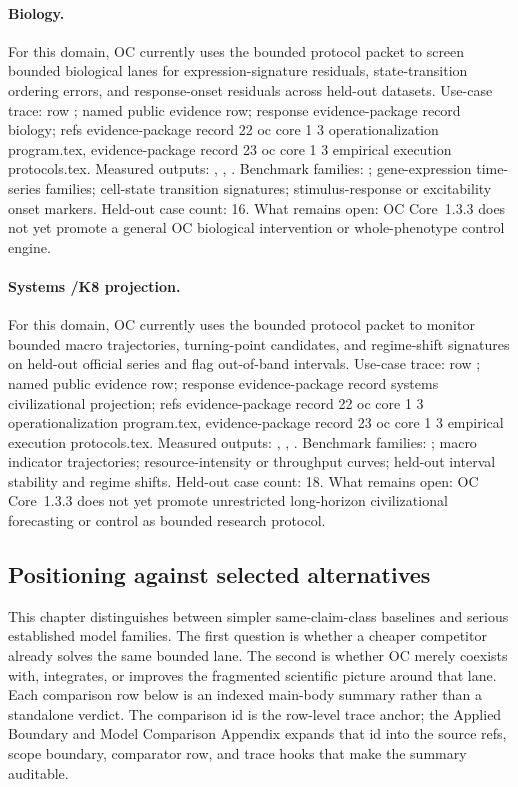 \paragraph{Biology.}
For this domain, OC currently uses the bounded protocol packet to screen bounded biological lanes for expression-signature residuals, state-transition ordering errors, and response-onset residuals across held-out datasets.
Use-case trace: row ; named public evidence row; \allowbreak response evidence-package record biology; \allowbreak refs evidence-package record 22 oc core 1 3 operationalization program.tex, \allowbreak evidence-package record 23 oc core 1 3 empirical execution protocols.tex.
Measured outputs: , , .
Benchmark families: ; gene-expression time-series families; cell-state transition signatures; stimulus-response or excitability onset markers.
Held-out case count: 16.
What remains open: OC Core~1.3.3 does not yet promote a general OC biological intervention or whole-phenotype control engine.

\paragraph{Systems /\allowbreak K8 projection.}
For this domain, OC currently uses the bounded protocol packet to monitor bounded macro trajectories, turning-point candidates, and regime-shift signatures on held-out official series and flag out-of-band intervals.
Use-case trace: row ; named public evidence row; \allowbreak response evidence-package record systems civilizational projection; \allowbreak refs evidence-package record 22 oc core 1 3 operationalization program.tex, \allowbreak evidence-package record 23 oc core 1 3 empirical execution protocols.tex.
Measured outputs: , , .
Benchmark families: ; macro indicator trajectories; resource-intensity or throughput curves; held-out interval stability and regime shifts.
Held-out case count: 18.
What remains open: OC Core~1.3.3 does not yet promote unrestricted long-horizon civilizational forecasting or control as bounded research protocol.

\subsection{Positioning against selected alternatives}
This chapter distinguishes between simpler same-claim-class baselines and serious established model families. The first question is whether a cheaper competitor already solves the same bounded lane. The second is whether OC merely coexists with, integrates, or improves the fragmented scientific picture around that lane.
Each comparison row below is an indexed main-body summary rather than a standalone verdict. The comparison id is the row-level trace anchor; the Applied Boundary and Model Comparison Appendix expands that id into the source refs, scope boundary, comparator row, and trace hooks that make the summary auditable.

